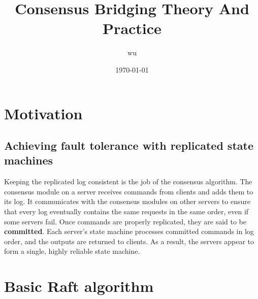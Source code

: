 \documentclass[11pt]{article}
\author{wu}
\date{\today}
\title{Consensus Bridging Theory And Practice}
\begin{document}
\maketitle
\section{Motivation}
\label{sec:orgc81f286}

\subsection{Achieving fault tolerance with replicated state machines}
\label{sec:org0bc4d9b}
Keeping the replicated log consistent is the job of the consensus algorithm. The consensus module on a
server receives commands from clients and adds them to its log. It communicates with the consensus
modules on other servers to ensure that every log eventually contains the same requests in the same
order, even if some servers fail. Once commands are properly replicated, they are said to be
\textbf{committed}. Each server’s state machine processes committed commands in log order, and the outputs are
returned to clients. As a result, the servers appear to form a single, highly reliable state machine.
\section{Basic Raft algorithm}
\label{sec:org982b7f7}
\end{document}
